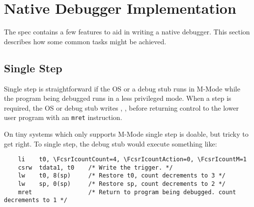 \section{Native Debugger Implementation}

The spec contains a few features to aid in writing a native debugger. This
section describes how some common tasks might be achieved.

\subsection{Single Step} \label{nativestep}

Single step is straightforward if the OS or a debug stub runs in M-Mode while the
program being debugged runs in a less privileged mode. When a step is required,
the OS or debug stub writes , ,
 before returning control to the lower user program with an
{\tt mret} instruction.

On tiny systems which only supports M-Mode single step is doable, but tricky to
get right. To single step, the debug stub would execute something like:
\begin{verbatim}
    li    t0, \FcsrIcountCount=4, \FcsrIcountAction=0, \FcsrIcountM=1
    csrw  tdata1, t0    /* Write the trigger. */
    lw    t0, 8(sp)     /* Restore t0, count decrements to 3 */
    lw    sp, 0(sp)     /* Restore sp, count decrements to 2 */
    mret                /* Return to program being debugged. count decrements to 1 */
\end{verbatim}
